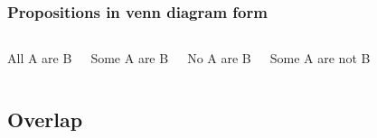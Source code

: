 \documentclass[10pt,letterpaper,xcolor=dvipsnames,handout]{beamer}
\begin{document}
\begin{frame}
  \frametitle{Propositions in venn diagram form}
  
  \begin{columns}[c]
  
  \begin{block}{All A are B}
    \begin{center}
    \end{center}  
  \end{block}
  
  \begin{block}{Some A are B}
    \begin{center}
    \end{center}  
  \end{block}

    \begin{block}{No A are B}
    \begin{center}
    \end{center}  
  \end{block}
  
  \begin{block}{Some A are not B}
    \begin{center}
    \end{center}  
  \end{block}
\end{columns}

\end{frame}

\subsection{Overlap}
\end{document}
